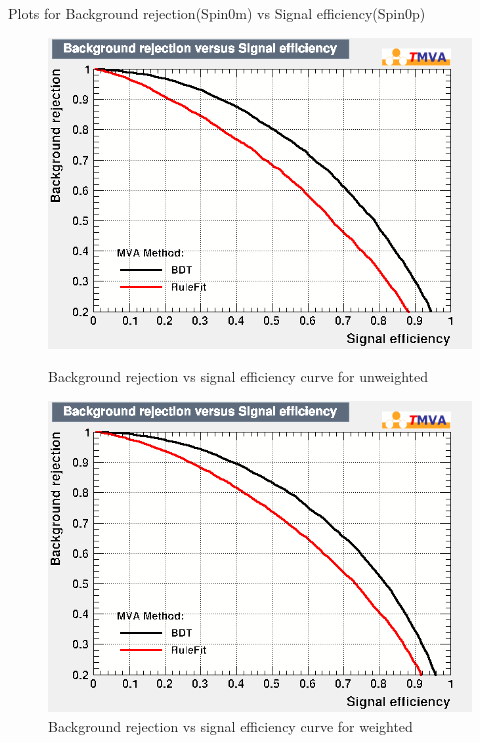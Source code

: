 \documentclass[english]{article}
\begin{document}
\newpage
Plots for Background rejection(Spin0m) vs Signal efficiency(Spin0p)\\
\begin{figure}[!htb]
        \includegraphics[width=\linewidth]{bksig_roc_u}
        \caption{Background rejection vs signal efficiency curve for unweighted}
\endminipage\hfill
{}
        \includegraphics[width=\linewidth]{bksig_roc_w}
        \caption{Background rejection vs signal efficiency curve for weighted}
\endminipage\hfill
\end{figure}
\end{document}

